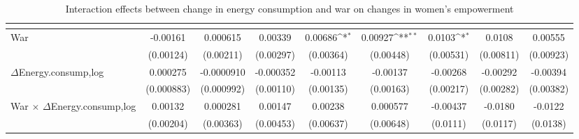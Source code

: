 \begin{table}[htbp]\centering
\def\sym#1{\ifmmode^{#1}\else\(^{#1}\)\fi}
\caption{Interaction effects between change in energy consumption and war on changes in women's empowerment \label{interaction}}
\begin{tabular}{l*{8}{c}}
\hline\hline
                    &&&&&&&&\\
\hline
War            &    -0.00161         &    0.000615         &     0.00339         &     0.00686\sym{*}  &     0.00927\sym{**} &      0.0103\sym{*}  &      0.0108         &     0.00555         \\
                    &   (0.00124)         &   (0.00211)         &   (0.00297)         &   (0.00364)         &   (0.00448)         &   (0.00531)         &   (0.00811)         &   (0.00923)         \\
[1em]
$\Delta$Energy.consump,log             &    0.000275         &  -0.0000910         &   -0.000352         &    -0.00113         &    -0.00137         &    -0.00268         &    -0.00292         &    -0.00394         \\
                    &  (0.000883)         &  (0.000992)         &   (0.00110)         &   (0.00135)         &   (0.00163)         &   (0.00217)         &   (0.00282)         &   (0.00382)         \\
[1em]
War $\times$ $\Delta$Energy.consump,log&     0.00132         &    0.000281         &     0.00147         &     0.00238         &    0.000577         &    -0.00437         &     -0.0180         &     -0.0122         \\
                    &   (0.00204)         &   (0.00363)         &   (0.00453)         &   (0.00637)         &   (0.00648)         &    (0.0111)         &    (0.0117)         &    (0.0138)         \\

\end{tabular}
\end{table}
